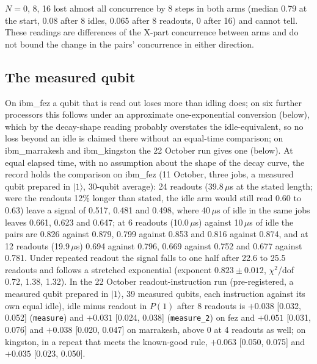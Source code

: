 \documentclass[reprint,amsmath,amssymb,aps,superscriptaddress,nofootinbib]{revtex4-2}
\newcommand{\us}{\,$\mu$s}
\begin{document}
$N=0$, 8, 16 lost almost all concurrence by 8 steps in both arms (median 0.79 at the start, 0.08 after 8 idles, 0.065 after 8 readouts, 0 after 16) and cannot tell. These readings are differences of the X-part concurrence between arms and do not bound the change in the pairs' concurrence in either direction.

\subsection{The measured qubit}\label{sec:measured}

On ibm\_fez a qubit that is read out loses more than idling does; on six further processors this follows under an approximate one-exponential conversion (below), which by the decay-shape reading probably overstates the idle-equivalent, so no loss beyond an idle is claimed there without an equal-time comparison; on ibm\_marrakesh and ibm\_kingston the 22 October run gives one (below). At equal elapsed time, with no assumption about the shape of the decay curve, the record holds the comparison on ibm\_fez (11 October, three jobs, a measured qubit prepared in $|1\rangle$, 30-qubit average): 24 readouts (39.8\us{} at the stated length; were the readouts 12\% longer than stated, the idle arm would still read 0.60 to 0.63) leave a signal of 0.517, 0.481 and 0.498, where 40\us{} of idle in the same jobs leaves 0.661, 0.623 and 0.647; at 6 readouts (10.0\us) against 10\us{} of idle the pairs are 0.826 against 0.879, 0.799 against 0.853 and 0.816 against 0.874, and at 12 readouts (19.9\us) 0.694 against 0.796, 0.669 against 0.752 and 0.677 against 0.781. Under repeated readout the signal falls to one half after 22.6 to 25.5 readouts and follows a stretched exponential (exponent $0.823\pm0.012$, $\chi^2$/dof 0.72, 1.38, 1.32). In the 22 October readout-instruction run (pre-registered, a measured qubit prepared in $|1\rangle$, 39 measured qubits, each instruction against its own equal idle), idle minus readout in $P(1)$ after 8 readouts is $+0.038$ [0.032, 0.052] (\texttt{measure}) and $+0.031$ [0.024, 0.038] (\texttt{measure\_2}) on fez and $+0.051$ [0.031, 0.076] and $+0.038$ [0.020, 0.047] on marrakesh, above 0 at 4 readouts as well; on kingston, in a repeat that meets the known-good rule, $+0.063$ [0.050, 0.075] and $+0.035$ [0.023, 0.050].
\end{document}
